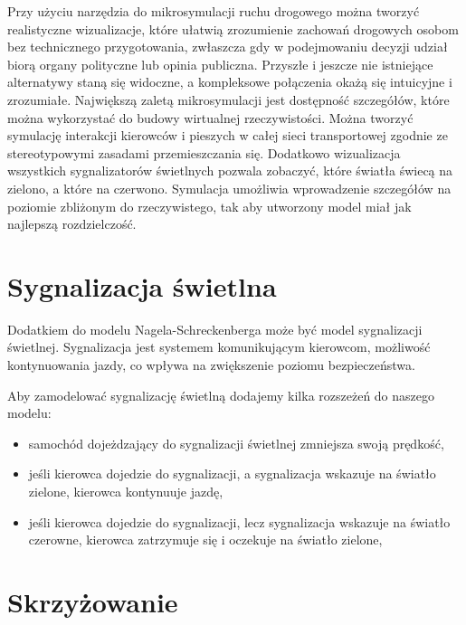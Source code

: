 \documentclass{sprawozdanie-agh}
\begin{document}
\begin{multicols}{2}
		Przy użyciu narzędzia do mikrosymulacji ruchu drogowego można tworzyć realistyczne wizualizacje, które ułatwią zrozumienie zachowań drogowych osobom bez technicznego przygotowania, zwłaszcza gdy w podejmowaniu decyzji udział biorą organy polityczne lub opinia publiczna. Przyszłe i jeszcze nie istniejące alternatywy staną się widoczne, a kompleksowe połączenia okażą się intuicyjne i zrozumiałe.
		Największą zaletą mikrosymulacji jest dostępność szczegółów, które można wykorzystać do budowy wirtualnej rzeczywistości. Można tworzyć symulację interakcji kierowców i pieszych w całej sieci transportowej zgodnie ze stereotypowymi zasadami przemieszczania się. Dodatkowo wizualizacja wszystkich sygnalizatorów świetlnych pozwala zobaczyć, które światła świecą na zielono, a które na czerwono. Symulacja umożliwia wprowadzenie szczegółów na poziomie zbliżonym do rzeczywistego, tak aby utworzony model miał jak najlepszą rozdzielczość.




		\section{Sygnalizacja świetlna}

		Dodatkiem do modelu Nagela-Schreckenberga może być model sygnalizacji świetlnej. Sygnalizacja jest systemem komunikującym kierowcom, możliwość kontynuowania jazdy, co wpływa na zwiększenie poziomu bezpieczeństwa.

		Aby zamodelować sygnalizację świetlną dodajemy kilka rozszeżeń do naszego modelu:
		\begin{itemize}
			\item samochód dojeżdzający do sygnalizacji świetlnej zmniejsza swoją prędkość,
			\item jeśli kierowca dojedzie do sygnalizacji, a sygnalizacja wskazuje na światło zielone, kierowca kontynuuje jazdę,
			\item jeśli kierowca dojedzie do sygnalizacji, lecz sygnalizacja wskazuje na światło czerowne, kierowca zatrzymuje się i oczekuje na światło zielone,
		\end{itemize}

		\section{Skrzyżowanie}


\end{multicols}
\end{document}
